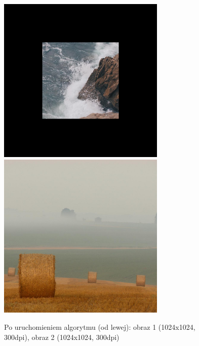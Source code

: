 \documentclass[a4paper,12pt]{book}
\begin{document}
\begin{figure}
	\caption{Po uruchomieniem algorytmu (od lewej): obraz 1 (1024x1024, 300dpi), obraz 2 (1024x1024, 300dpi)}
	\includegraphics[width=8cm, height=8cm]{sea-geo-modified.png}
	\includegraphics[width=8cm, height=8cm]{field-unmodified.jpg}
\end{figure}
\end{document}
